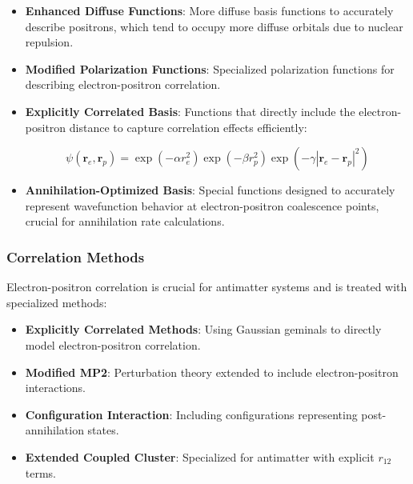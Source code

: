 \documentclass[10pt,twocolumn,a4paper]{article}
\begin{document}
\begin{itemize}
    \item \textbf{Enhanced Diffuse Functions}: More diffuse basis functions to accurately describe positrons, which tend to occupy more diffuse orbitals due to nuclear repulsion.
    
    \item \textbf{Modified Polarization Functions}: Specialized polarization functions for describing electron-positron correlation.
    
    \item \textbf{Explicitly Correlated Basis}: Functions that directly include the electron-positron distance to capture correlation effects efficiently:
    
    \begin{equation}
        \psi(\textbf{r}_e, \textbf{r}_p) = \exp(-\alpha r_e^2) \exp(-\beta r_p^2) \exp(-\gamma |\textbf{r}_e - \textbf{r}_p|^2)
    \end{equation}
    
    \item \textbf{Annihilation-Optimized Basis}: Special functions designed to accurately represent wavefunction behavior at electron-positron coalescence points, crucial for annihilation rate calculations.
\end{itemize}

\subsubsection{Correlation Methods}
Electron-positron correlation is crucial for antimatter systems and is treated with specialized methods:

\begin{itemize}
    \item \textbf{Explicitly Correlated Methods}: Using Gaussian geminals to directly model electron-positron correlation.
    
    \item \textbf{Modified MP2}: Perturbation theory extended to include electron-positron interactions.
    
    \item \textbf{Configuration Interaction}: Including configurations representing post-annihilation states.
    
    \item \textbf{Extended Coupled Cluster}: Specialized for antimatter with explicit $r_{12}$ terms.
\end{itemize}
\end{document}
